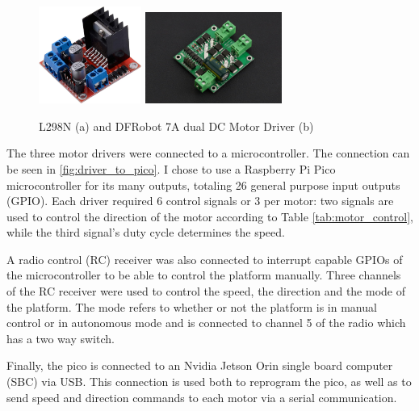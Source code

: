 \documentclass[11pt]{article}
\begin{document}
                
                \begin{figure}[h]
                    \centering
                    \includegraphics[width=0.3\textwidth]{Images/olddrivers.jpg}
                    \includegraphics[width=0.4\textwidth]{Images/newdrivers.jpg}
                    \caption{L298N (a) and DFRobot 7A dual DC Motor Driver (b)}
                    \label{fig:drivers_comparison}
                \end{figure}

                The three motor drivers were connected to a microcontroller. The connection can be seen in \ref{fig:driver_to_pico}.
                I chose to use a Raspberry Pi Pico microcontroller for its many outputs, totaling 26 general purpose input outputs (GPIO). Each driver required 6 control signals or 3 per motor: two signals are used to control the direction of the motor according to Table \ref{tab:motor_control}, while the third signal's duty cycle determines the speed.

                A radio control (RC) receiver was also connected to interrupt capable GPIOs of the microcontroller to be able to control the platform manually. Three channels of the RC receiver were used to control the speed, the direction and the mode of the platform. The mode refers to whether or not the platform is in manual control or in autonomous mode and is connected to channel 5 of the radio which has a two way switch.

                Finally, the pico is connected to an Nvidia Jetson Orin single board computer (SBC) via USB. This connection is used both to reprogram the pico, as well as to send speed and direction commands to each motor via a serial communication. 
\end{document}
